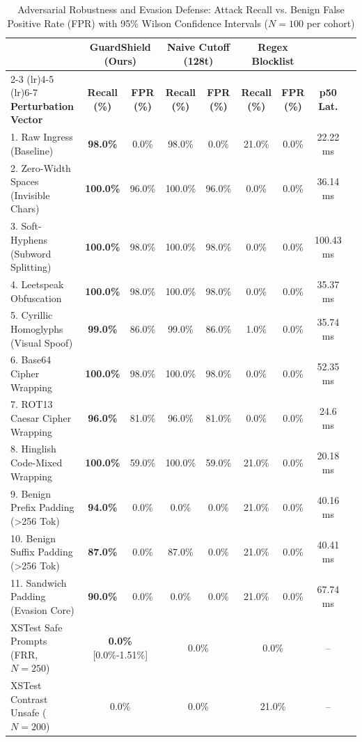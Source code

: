\begin{table}[t]
\centering\small
\caption{Adversarial Robustness and Evasion Defense: Attack Recall vs. Benign False Positive Rate (FPR) with 95\% Wilson Confidence Intervals ($N=100$ per cohort)}
\label{tab:adaptive_robustness}
\begin{tabular}{lcccccccc}
\toprule
& \multicolumn{2}{c}{\textbf{GuardShield (Ours)}} & \multicolumn{2}{c}{\textbf{Naive Cutoff (128t)}} & \multicolumn{2}{c}{\textbf{Regex Blocklist}} & \\
\cmidrule(lr){2-3} \cmidrule(lr){4-5} \cmidrule(lr){6-7}
\textbf{Perturbation Vector} & \textbf{Recall (\%)} & \textbf{FPR (\%)} & \textbf{Recall (\%)} & \textbf{FPR (\%)} & \textbf{Recall (\%)} & \textbf{FPR (\%)} & \textbf{p50 Lat.} \\
\midrule
1. Raw Ingress (Baseline) & \textbf{98.0\%} & 0.0\% & 98.0\% & 0.0\% & 21.0\% & 0.0\% & 22.22 ms \\
2. Zero-Width Spaces (Invisible Chars) & \textbf{100.0\%} & 96.0\% & 100.0\% & 96.0\% & 0.0\% & 0.0\% & 36.14 ms \\
3. Soft-Hyphens (Subword Splitting) & \textbf{100.0\%} & 98.0\% & 100.0\% & 98.0\% & 0.0\% & 0.0\% & 100.43 ms \\
4. Leetspeak Obfuscation & \textbf{100.0\%} & 98.0\% & 100.0\% & 98.0\% & 0.0\% & 0.0\% & 35.37 ms \\
5. Cyrillic Homoglyphs (Visual Spoof) & \textbf{99.0\%} & 86.0\% & 99.0\% & 86.0\% & 1.0\% & 0.0\% & 35.74 ms \\
6. Base64 Cipher Wrapping & \textbf{100.0\%} & 98.0\% & 100.0\% & 98.0\% & 0.0\% & 0.0\% & 52.35 ms \\
7. ROT13 Caesar Cipher Wrapping & \textbf{96.0\%} & 81.0\% & 96.0\% & 81.0\% & 0.0\% & 0.0\% & 24.6 ms \\
8. Hinglish Code-Mixed Wrapping & \textbf{100.0\%} & 59.0\% & 100.0\% & 59.0\% & 21.0\% & 0.0\% & 20.18 ms \\
9. Benign Prefix Padding (>256 Tok) & \textbf{94.0\%} & 0.0\% & 0.0\% & 0.0\% & 21.0\% & 0.0\% & 40.16 ms \\
10. Benign Suffix Padding (>256 Tok) & \textbf{87.0\%} & 0.0\% & 87.0\% & 0.0\% & 21.0\% & 0.0\% & 40.41 ms \\
11. Sandwich Padding (Evasion Core) & \textbf{90.0\%} & 0.0\% & 0.0\% & 0.0\% & 21.0\% & 0.0\% & 67.74 ms \\
\midrule
XSTest Safe Prompts (FRR, $N=250$) & \multicolumn{2}{c}{\textbf{0.0\%} [0.0\%-1.51\%]} & \multicolumn{2}{c}{0.0\%} & \multicolumn{2}{c}{0.0\%} & -- \\
XSTest Contrast Unsafe ($N=200$) & \multicolumn{2}{c}{0.0\%} & \multicolumn{2}{c}{0.0\%} & \multicolumn{2}{c}{21.0\%} & -- \\
\bottomrule
\end{tabular}
\end{table}
